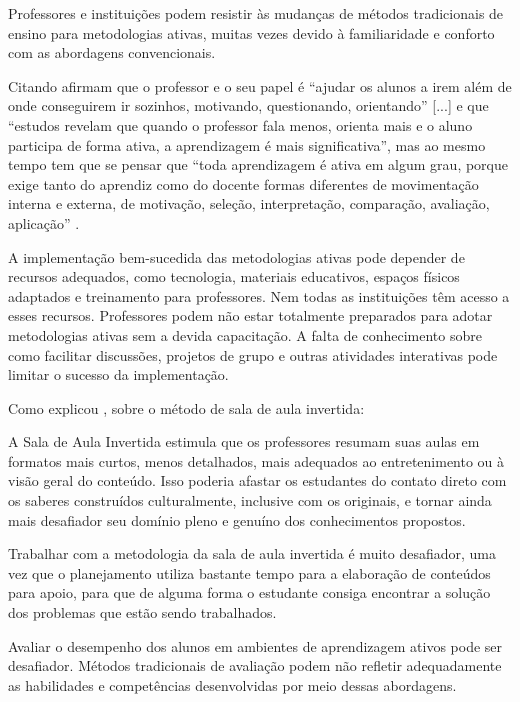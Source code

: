 Professores e instituições podem resistir às mudanças de métodos tradicionais de ensino para metodologias ativas, muitas vezes devido à familiaridade e conforto com as abordagens convencionais.

Citando  afirmam que o professor e o seu papel é ``ajudar os alunos a irem além de onde conseguirem ir sozinhos, motivando, questionando, orientando'' [...] e que ``estudos revelam que quando o professor fala menos, orienta mais e o aluno participa de forma ativa, a aprendizagem é mais significativa'', mas ao mesmo tempo tem que se pensar que ``toda aprendizagem é ativa em algum grau, porque exige tanto do aprendiz como do docente formas diferentes de movimentação interna e externa, de motivação, seleção, interpretação, comparação, avaliação, aplicação'' \cite[p. 3]{BACICHMORAN2018}.

A implementação bem-sucedida das metodologias ativas pode depender de recursos adequados, como tecnologia, materiais educativos, espaços físicos adaptados e treinamento para professores. Nem todas as instituições têm acesso a esses recursos. Professores podem não estar totalmente preparados para adotar metodologias ativas sem a devida capacitação. A falta de conhecimento sobre como facilitar discussões, projetos de grupo e outras atividades interativas pode limitar o sucesso da implementação.

Como explicou , sobre o método de sala de aula invertida:

\begin{citacao}
    A Sala de Aula Invertida estimula que os professores resumam suas aulas em formatos mais curtos, menos detalhados, mais adequados ao entretenimento ou à visão geral do conteúdo. Isso poderia afastar os estudantes do contato direto com os saberes construídos culturalmente, inclusive com os originais, e tornar ainda mais desafiador seu domínio pleno e genuíno dos conhecimentos propostos. \cite[p. 224]{VALERIOMOREIRA2018}
\end{citacao}

Trabalhar com a metodologia da sala de aula invertida é muito desafiador, uma vez que o planejamento utiliza bastante tempo para a elaboração de conteúdos para apoio, para que de alguma forma o estudante consiga encontrar a solução dos problemas que estão sendo trabalhados.

Avaliar o desempenho dos alunos em ambientes de aprendizagem ativos pode ser desafiador. Métodos tradicionais de avaliação podem não refletir adequadamente as habilidades e competências desenvolvidas por meio dessas abordagens.

